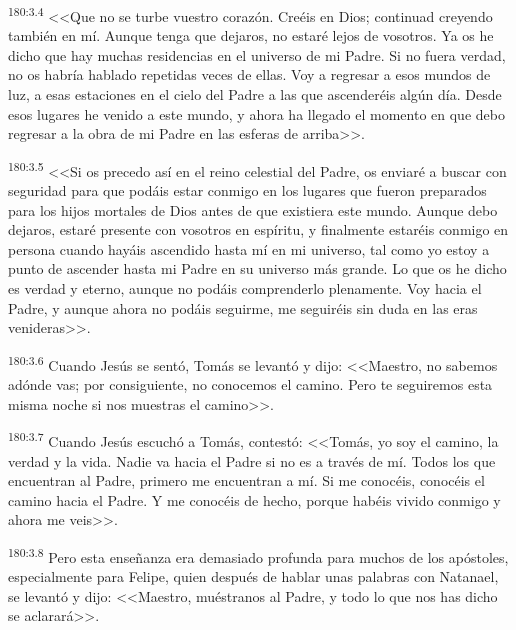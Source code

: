 \par 
\textsuperscript{180:3.4} <<Que no se turbe vuestro corazón. Creéis en Dios; continuad creyendo también en mí. Aunque tenga que dejaros, no estaré lejos de vosotros. Ya os he dicho que hay muchas residencias en el universo de mi Padre. Si no fuera verdad, no os habría hablado repetidas veces de ellas. Voy a regresar a esos mundos de luz, a esas estaciones en el cielo del Padre a las que ascenderéis algún día. Desde esos lugares he venido a este mundo, y ahora ha llegado el momento en que debo regresar a la obra de mi Padre en las esferas de arriba>>.

\par 
\textsuperscript{180:3.5} <<Si os precedo así en el reino celestial del Padre, os enviaré a buscar con seguridad para que podáis estar conmigo en los lugares que fueron preparados para los hijos mortales de Dios antes de que existiera este mundo. Aunque debo dejaros, estaré presente con vosotros en espíritu, y finalmente estaréis conmigo en persona cuando hayáis ascendido hasta mí en mi universo, tal como yo estoy a punto de ascender hasta mi Padre en su universo más grande. Lo que os he dicho es verdad y eterno, aunque no podáis comprenderlo plenamente. Voy hacia el Padre, y aunque ahora no podáis seguirme, me seguiréis sin duda en las eras venideras>>.

\par 
\textsuperscript{180:3.6} Cuando Jesús se sentó, Tomás se levantó y dijo: <<Maestro, no sabemos adónde vas; por consiguiente, no conocemos el camino. Pero te seguiremos esta misma noche si nos muestras el camino>>.

\par 
\textsuperscript{180:3.7} Cuando Jesús escuchó a Tomás, contestó: <<Tomás, yo soy el camino, la verdad y la vida. Nadie va hacia el Padre si no es a través de mí. Todos los que encuentran al Padre, primero me encuentran a mí. Si me conocéis, conocéis el camino hacia el Padre. Y me conocéis de hecho, porque habéis vivido conmigo y ahora me veis>>.

\par 
\textsuperscript{180:3.8} Pero esta enseñanza era demasiado profunda para muchos de los apóstoles, especialmente para Felipe, quien después de hablar unas palabras con Natanael, se levantó y dijo: <<Maestro, muéstranos al Padre, y todo lo que nos has dicho se aclarará>>.

